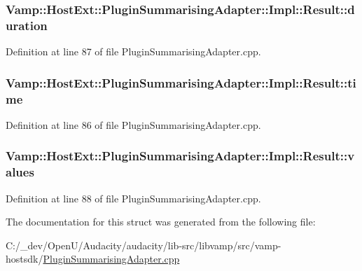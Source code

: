 \subsubsection[{\texorpdfstring{duration}{duration}}]{ Vamp\+::\+Host\+Ext\+::\+Plugin\+Summarising\+Adapter\+::\+Impl\+::\+Result\+::duration}\hypertarget{struct_vamp_1_1_host_ext_1_1_plugin_summarising_adapter_1_1_impl_1_1_result_a9119a867cd226e1a038811dd4ffb176d}{}\label{struct_vamp_1_1_host_ext_1_1_plugin_summarising_adapter_1_1_impl_1_1_result_a9119a867cd226e1a038811dd4ffb176d}


Definition at line 87 of file Plugin\+Summarising\+Adapter.\+cpp.

\subsubsection[{\texorpdfstring{time}{time}}]{ Vamp\+::\+Host\+Ext\+::\+Plugin\+Summarising\+Adapter\+::\+Impl\+::\+Result\+::time}\hypertarget{struct_vamp_1_1_host_ext_1_1_plugin_summarising_adapter_1_1_impl_1_1_result_a2a4c4f883310ff6947d12a7af9e9d7d7}{}\label{struct_vamp_1_1_host_ext_1_1_plugin_summarising_adapter_1_1_impl_1_1_result_a2a4c4f883310ff6947d12a7af9e9d7d7}


Definition at line 86 of file Plugin\+Summarising\+Adapter.\+cpp.

\subsubsection[{\texorpdfstring{values}{values}}]{ Vamp\+::\+Host\+Ext\+::\+Plugin\+Summarising\+Adapter\+::\+Impl\+::\+Result\+::values}\hypertarget{struct_vamp_1_1_host_ext_1_1_plugin_summarising_adapter_1_1_impl_1_1_result_a658a2cffdbc186b2a1c975f5a845c86b}{}\label{struct_vamp_1_1_host_ext_1_1_plugin_summarising_adapter_1_1_impl_1_1_result_a658a2cffdbc186b2a1c975f5a845c86b}


Definition at line 88 of file Plugin\+Summarising\+Adapter.\+cpp.



The documentation for this struct was generated from the following file\+:\begin{DoxyCompactItemize}
\item 
C\+:/\+\_\+dev/\+Open\+U/\+Audacity/audacity/lib-\/src/libvamp/src/vamp-\/hostsdk/\hyperlink{_plugin_summarising_adapter_8cpp}{Plugin\+Summarising\+Adapter.\+cpp}\end{DoxyCompactItemize}

